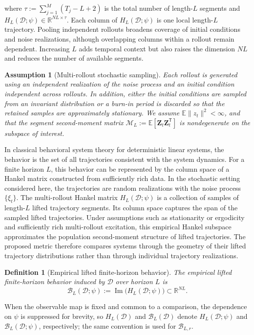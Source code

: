 \documentclass[letterpaper, 10 pt, conference]{ieeeconf}  %
\DeclareMathOperator*{\im}{Im}
\newtheorem{definition}{Definition}
\newtheorem{assumption}{Assumption}
\newcommand{\E}{\mathbb{E}}
\newcommand{\R}{\mathbb{R}}
\newcommand{\T}{^{\mathsf T}}
\begin{document}
where $\tau:=\sum_{j=1}^{M}(T_j-L+2)$ is the total number of length-$L$ segments and $H_L(\mathcal D; \psi)\in\R^{NL\times\tau}$.
Each column of $H_L(\mathcal D; \psi)$ is one local length-$L$ trajectory. Pooling independent rollouts broadens coverage of initial conditions and noise realizations, although overlapping columns within a rollout remain dependent. Increasing $L$ adds temporal context but also raises the dimension $NL$ and reduces the number of available segments.

\begin{assumption}[Multi-rollout stochastic sampling]
\label{ass:stoch_sampling}
Each rollout is generated using an independent realization of the noise process and an initial condition independent across rollouts. In addition, either the initial conditions are sampled from an invariant distribution or a burn-in period is discarded so that the retained samples are approximately stationary. We assume $\E\|z_t\|^2<\infty$, and that the segment second-moment matrix $\mathcal M_L:=\E[\mathbf Z_t\mathbf Z_t\T]$ is nondegenerate on the subspace of interest.
\end{assumption}

In classical behavioral system theory for deterministic linear systems, the behavior is the set of all trajectories consistent with the system dynamics. For a finite horizon $L$, this behavior can be represented by the column space of a Hankel matrix constructed from sufficiently rich data.
In the stochastic setting considered here, the trajectories are random realizations with the noise process $\{\xi_t\}$. The multi-rollout Hankel matrix $H_L(\mathcal D; \psi)$ is a collection of samples of length-$L$ lifted trajectory segments. Its column space captures the span of the sampled lifted trajectories.
Under assumptions such as stationarity or ergodicity and sufficiently rich multi-rollout excitation, this empirical Hankel subspace approximates the population second-moment structure of lifted trajectories. The proposed metric therefore compares systems through the geometry of their lifted trajectory distributions rather than through individual trajectory realizations.

\begin{definition}[Empirical lifted finite-horizon behavior]
\label{def:empirical_behavior}
The empirical lifted finite-horizon behavior induced by $\mathcal D$ over horizon $L$ is
\begin{equation}
  \mathcal B_L(\mathcal D; \psi):=\im\!\big(H_L(\mathcal D; \psi)\big)\subset\R^{NL}.
  \label{eq:behavior_subspace}
\end{equation}
\end{definition}
When the observable map is fixed and common to a comparison, the dependence on $\psi$ is suppressed for brevity, so $H_L(\mathcal D)$ and $\mathcal B_L(\mathcal D)$ denote $H_L(\mathcal D;\psi)$ and $\mathcal B_L(\mathcal D;\psi)$, respectively; the same convention is used for $\mathcal B_{L,r}$.
\end{document}
